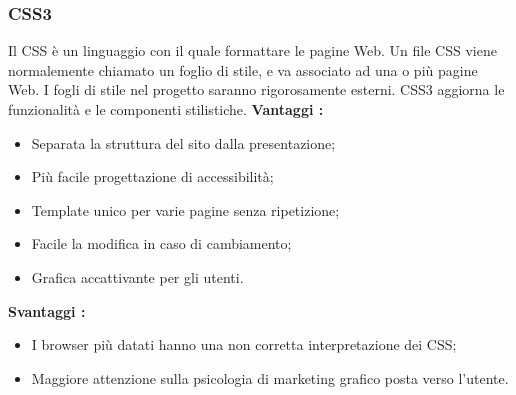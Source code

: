 {{		\subsubsection{CSS3}{
			Il CSS è un linguaggio con il quale formattare le pagine Web. Un file CSS viene normalemente chiamato un foglio di stile, e va associato ad una o più pagine Web. I fogli di stile nel progetto saranno rigorosamente esterni. CSS3 aggiorna le funzionalità e le componenti stilistiche.
			\textbf{Vantaggi :}
			\begin{itemize}\itemsep1pt
				\item Separata la struttura del sito dalla presentazione;
				\item Più facile progettazione di accessibilità;
				\item Template unico per varie pagine senza ripetizione;
				\item Facile la modifica in caso di cambiamento;
				\item Grafica accattivante per gli utenti.
			\end{itemize}
			\textbf{Svantaggi :}
			\begin{itemize}\itemsep1pt
				\item I browser più datati hanno una non corretta interpretazione dei CSS;
				\item Maggiore attenzione sulla psicologia di marketing grafico posta verso l'utente.
			\end{itemize}
		}
}}
